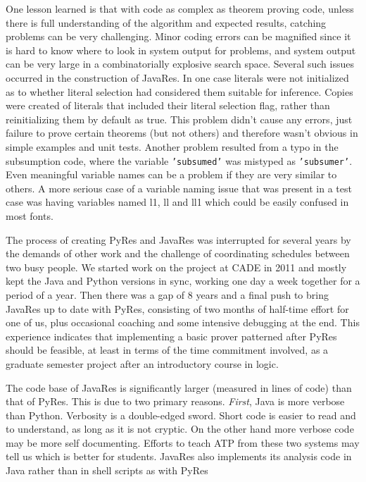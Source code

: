 \documentclass{llncs}
\begin{document}
One lesson learned is that with code as complex as theorem proving
code, unless there is full understanding of the algorithm and expected
results, catching problems can be very challenging.  Minor coding
errors can be magnified since it is hard to know where to look in
system output for problems, and system output can be very large in a
combinatorially explosive search space.  Several such issues occurred
in the construction of JavaRes.  In one case literals were not
initialized as to whether literal selection had considered them
suitable for inference.  Copies were created of literals that included
their literal selection flag, rather than reinitializing them by
default as true.  This problem didn't cause any errors, just failure
to prove certain theorems (but not others) and therefore wasn't
obvious in simple examples and unit tests.  Another problem resulted
from a typo in the subsumption code, where the variable
\texttt{'subsumed'} was mistyped as \texttt{'subsumer'}.  Even
meaningful variable names can be a problem if they are very similar to
others.  A more serious case of a variable naming issue that was
present in a test case was having variables named l1, ll and ll1 which
could be easily confused in most fonts.

The process of creating PyRes and JavaRes was interrupted for several
years by the demands of other work and the challenge of coordinating
schedules between two busy people.  We started work on the project at
CADE in 2011 and mostly kept the Java and Python versions in sync,
working one day a week together for a period of a year.  Then there was a gap of 8 years and
a final push to bring JavaRes up to date with PyRes, consisting of two
months of half-time effort for one of us, plus occasional coaching and
some intensive debugging at the end.  This experience indicates that
implementing a basic prover patterned after PyRes should be feasible,
at least in terms of the time commitment involved, as a
graduate semester project after an introductory course in logic.

The code base of JavaRes is significantly larger (measured in lines of
code) than that of PyRes. This is due to two primary reasons. \textit{First}, Java
is more verbose than Python.  Verbosity is a double-edged sword. Short code is easier to
read and to understand, as long as it is not cryptic. On the other
hand more verbose code may be more self documenting. Efforts to teach
ATP from these two systems may tell us which is better for students.
JavaRes also implements its analysis code in Java
rather than in shell scripts as with PyRes
\end{document}
